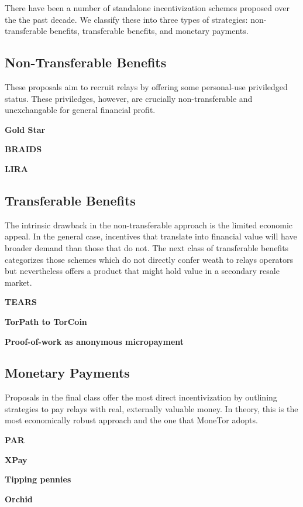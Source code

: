 There have been a number of standalone incentivization schemes proposed over the
the past decade. We classify these into three types of strategies:
non-transferable benefits, transferable benefits, and monetary payments.

\subsection{Non-Transferable Benefits}

These proposals aim to recruit relays by offering some personal-use priviledged
status. These priviledges, however, are crucially non-transferable and
unexchangable for general financial profit.

\textbf{Gold Star} ~\cite{dingledine2010building}

\textbf{BRAIDS} ~\cite{jansen2010recruiting}

\textbf{LIRA} ~\cite{jansen2013lira}

\subsection{Transferable Benefits}

The intrinsic drawback in the non-transferable approach is the limited economic
appeal. In the general case, incentives that translate into financial value will
have broader demand than those that do not. The next class of transferable
benefits categorizes those schemes which do not directly confer weath to relays
operators but nevertheless offers a product that might hold value in a secondary
resale market.

\textbf{TEARS} ~\cite{jansen2014onions}

\textbf{TorPath to TorCoin} ~\cite{ghosh2014torpath}

\textbf{Proof-of-work as anonymous micropayment} ~\cite{biryukov2015proof}

\subsection{Monetary Payments}

Proposals in the final class offer the most direct incentivization by outlining
strategies to pay relays with real, externally valuable money. In theory, this
is the most economically robust approach and the one that MoneTor adopts.

\textbf{PAR} ~\cite{androulaki2008payment}

\textbf{XPay} ~\cite{chen2009xpay}

\textbf{Tipping pennies} ~\cite{carbunar2012tipping}

\textbf{Orchid} ~\cite{salamon2018orchid}